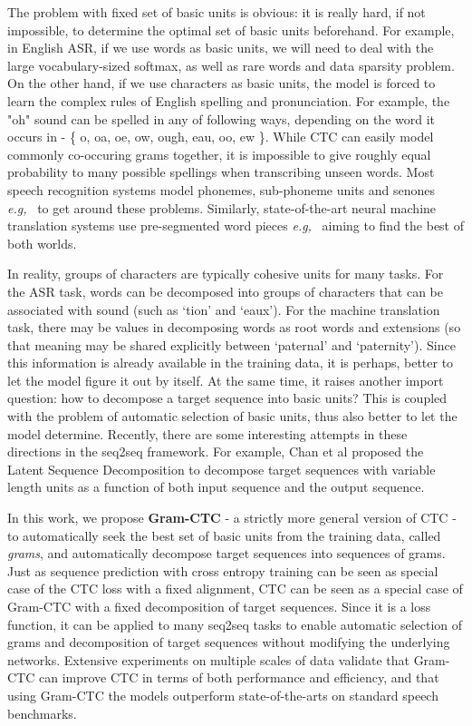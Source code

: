 \documentclass{article}
\def\eg{{\it e.g,}}
\begin{document}
The problem with fixed set of basic units is obvious: it is really hard, if not impossible, to determine the optimal set of basic units beforehand. For example, in English ASR, if we use words as basic units, we will need to deal with the large vocabulary-sized softmax, as well as rare words and data sparsity problem. On the other hand, if we use characters as basic units, the model is forced to learn the complex rules of English spelling and pronunciation. For example, the "oh" sound can be spelled in any of following ways, depending on the word it occurs in - \{ o, oa, oe, ow, ough, eau, oo, ew \}. While CTC can easily model commonly co-occuring grams together, it is impossible to give roughly equal probability to many possible spellings when transcribing unseen words. Most speech recognition systems model phonemes, sub-phoneme units and senones \eg ~ \cite{xiong2016microsoft} to get around these problems. Similarly, state-of-the-art neural machine translation systems use pre-segmented word pieces \eg ~\cite{Wu2016GooglesNM} aiming to find the best of both worlds. 

In reality, groups of characters are typically cohesive units for many tasks. For the ASR task, words can be decomposed into groups of characters that can be associated with sound (such as `tion' and `eaux'). For the machine translation task, there may be values in decomposing words as root words and extensions (so that meaning may be shared explicitly between `paternal' and `paternity'). Since this information is already available in the training data, it is perhaps, better to let the model figure it out by itself. At the same time, it raises another import question: how to decompose a target sequence into basic units? This is coupled with the problem of automatic selection of basic units, thus also better to let the model determine. Recently, there are some interesting attempts in these directions in the seq2seq framework. For example, Chan et al \cite{chan2016lsd} proposed the Latent Sequence Decomposition to decompose target sequences with variable length units as a function of both input sequence and the output sequence. 

In this work, we propose \textbf{Gram-CTC} - a strictly more general version of CTC - to automatically seek the best set of basic units from the training data, called \emph{grams}, and automatically decompose target sequences into sequences of grams. Just as sequence prediction with cross entropy training can be seen as special case of the CTC loss with a fixed alignment, CTC can be seen as a special case of Gram-CTC with a fixed decomposition of target sequences. Since it is a loss function, it can be applied to many seq2seq tasks to enable automatic selection of grams and decomposition of target sequences without modifying the underlying networks. 
Extensive experiments on multiple scales of data validate that Gram-CTC can improve CTC in terms of both performance and efficiency, and that using Gram-CTC the models outperform state-of-the-arts on standard speech benchmarks.
\end{document}
